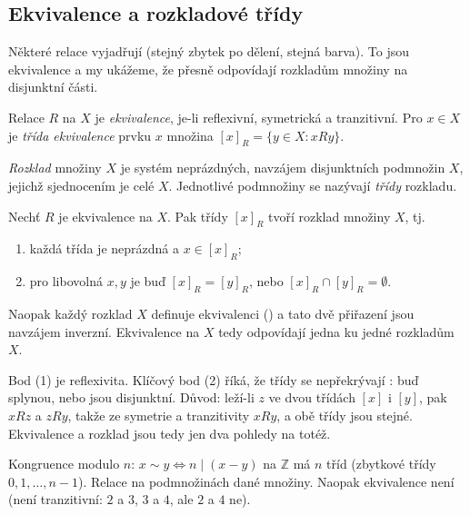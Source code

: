 \documentclass[11pt,a4paper]{article}
\newcommand{\eqcl}[1]{[#1]}
\begin{document}
\subsection{Ekvivalence a rozkladové třídy}

Některé relace vyjadřují  (stejný zbytek po dělení, stejná barva). To jsou ekvivalence a my ukážeme, že přesně odpovídají rozkladům množiny na disjunktní části.

\begin{definice}
Relace $R$ na $X$ je \emph{ekvivalence}, je-li reflexivní, symetrická a tranzitivní. Pro $x\in X$ je \emph{třída ekvivalence} prvku $x$ množina $\eqcl{x}_R=\{y\in X:xRy\}$.
\end{definice}

\begin{definice}
\emph{Rozklad} množiny $X$ je systém neprázdných, navzájem disjunktních podmnožin $X$, jejichž sjednocením je celé $X$. Jednotlivé podmnožiny se nazývají \emph{třídy} rozkladu.
\end{definice}

\begin{veta}
Nechť $R$ je ekvivalence na $X$. Pak třídy $\eqcl{x}_R$ tvoří rozklad množiny $X$, tj.
\begin{enumerate}[label=(\arabic*)]
  \item každá třída je neprázdná a $x\in\eqcl{x}_R$;
  \item pro libovolná $x,y$ je buď $\eqcl{x}_R=\eqcl{y}_R$, nebo $\eqcl{x}_R\cap\eqcl{y}_R=\emptyset$.
\end{enumerate}
Naopak každý rozklad $X$ definuje ekvivalenci () a tato dvě přiřazení jsou navzájem inverzní. Ekvivalence na $X$ tedy odpovídají jedna ku jedné rozkladům $X$.
\end{veta}

\begin{intuice}
Bod (1) je reflexivita. Klíčový bod (2) říká, že třídy se nepřekrývají : buď splynou, nebo jsou disjunktní. Důvod: leží-li $z$ ve dvou třídách $\eqcl{x}$ i $\eqcl{y}$, pak $xRz$ a $zRy$, takže ze symetrie a tranzitivity $xRy$, a obě třídy jsou stejné. Ekvivalence a rozklad jsou tedy jen dva pohledy na totéž.
\end{intuice}

\begin{priklad}
Kongruence modulo $n$: $x\sim y\iff n\mid(x-y)$ na $\mathbb{Z}$ má $n$ tříd (zbytkové třídy $0,1,\dots,n-1$). Relace  na podmnožinách dané množiny. Naopak  ekvivalence není (není tranzitivní: $2$ a $3$, $3$ a $4$, ale $2$ a $4$ ne).
\end{priklad}
\end{document}
